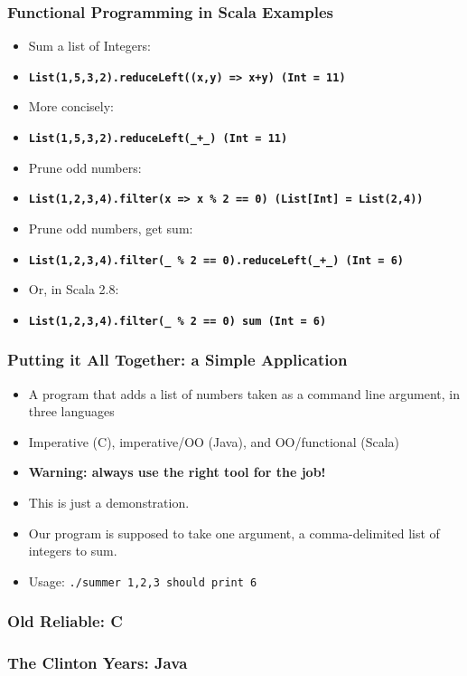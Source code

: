 \begin{frame} 
\frametitle{Functional Programming in Scala Examples}
\begin{itemize}
  \item<1-> Sum a list of Integers:
  \item<1-> \tt\small\textbf{List(1,5,3,2).reduceLeft((x,y) => x+y) (Int = 11)}
  \item<2-> More concisely:
  \item<2-> \tt\small\textbf{List(1,5,3,2).reduceLeft(\_+\_) (Int = 11)}
  \item<3-> Prune odd numbers:
  \item<3-> \tt\small\textbf{List(1,2,3,4).filter(x => x \% 2 == 0) (List[Int] = List(2,4))}
  \item<4-> Prune odd numbers, get sum:
  \item<4-> \tt\small\textbf{List(1,2,3,4).filter(\_ \% 2 == 0).reduceLeft(\_+\_) (Int = 6)}
  \item<5-> Or, in Scala 2.8:
  \item<5-> \tt\small\textbf{List(1,2,3,4).filter(\_ \% 2 == 0) sum (Int = 6)}
\end{itemize}
\end{frame} 

\begin{frame} 
\frametitle{Putting it All Together: a Simple Application}
\begin{itemize}
  \item<1-> A program that adds a list of numbers taken as a command line argument, in three languages 
  \item<2-> Imperative (C), imperative/OO (Java), and OO/functional (Scala)
  \item<3-> \textbf{Warning: always use the right tool for the job!}
  \item<3-> This is just a demonstration.
  \item<4-> Our program is supposed to take one argument, a comma-delimited list of integers to sum.
  \item<4-> Usage: \tt{./summer 1,2,3} should print 6
\end{itemize}
\end{frame} 

\begin{frame} 
\frametitle{Old Reliable: C}
\tt\tiny{

}
\end{frame} 

\begin{frame} 
\frametitle{The Clinton Years: Java}
\tt\tiny{

}
\end{frame} 

